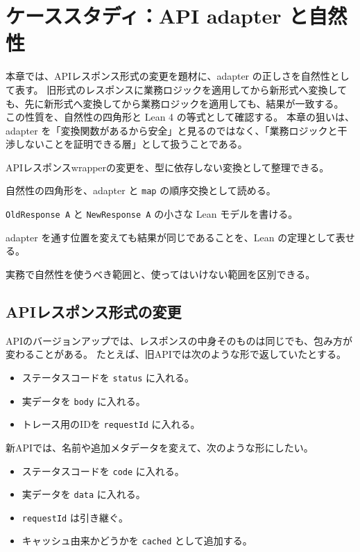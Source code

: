 \chapter{ケーススタディ：API adapter と自然性}
\label{chap:ch25-api-adapter-naturality}

\begin{chapterabstract}
本章では、APIレスポンス形式の変更を題材に、adapter の正しさを自然性として表す。
旧形式のレスポンスに業務ロジックを適用してから新形式へ変換しても、先に新形式へ変換してから業務ロジックを適用しても、結果が一致する。
この性質を、自然性の四角形と Lean 4 の等式として確認する。
本章の狙いは、adapter を「変換関数があるから安全」と見るのではなく、「業務ロジックと干渉しないことを証明できる層」として扱うことである。
\end{chapterabstract}

\begin{learninggoals}
\item APIレスポンスwrapperの変更を、型に依存しない変換として整理できる。
\item 自然性の四角形を、adapter と \texttt{map} の順序交換として読める。
\item \texttt{OldResponse A} と \texttt{NewResponse A} の小さな Lean モデルを書ける。
\item adapter を通す位置を変えても結果が同じであることを、Lean の定理として表せる。
\item 実務で自然性を使うべき範囲と、使ってはいけない範囲を区別できる。
\end{learninggoals}

\section{APIレスポンス形式の変更}

APIのバージョンアップでは、レスポンスの中身そのものは同じでも、包み方が変わることがある。
たとえば、旧APIでは次のような形で返していたとする。

\begin{itemize}
\item ステータスコードを \texttt{status} に入れる。
\item 実データを \texttt{body} に入れる。
\item トレース用のIDを \texttt{requestId} に入れる。
\end{itemize}

新APIでは、名前や追加メタデータを変えて、次のような形にしたい。

\begin{itemize}
\item ステータスコードを \texttt{code} に入れる。
\item 実データを \texttt{data} に入れる。
\item \texttt{requestId} は引き継ぐ。
\item キャッシュ由来かどうかを \texttt{cached} として追加する。
\end{itemize}

